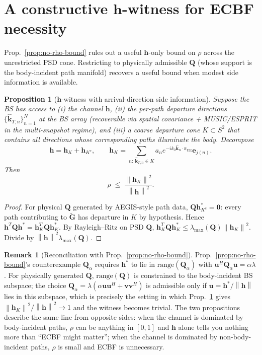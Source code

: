 \documentclass[11pt,a4paper]{article}
\newtheorem{proposition}[theorem]{Proposition}
\theoremstyle{definition}
\newtheorem{remark}[theorem]{Remark}
\newcommand{\rr}{\mathbf{r}}
\newcommand{\hh}{\mathbf{h}}
\newcommand{\kh}{\hat{\mathbf{k}}}
\newcommand{\Q}{\mathbf{Q}}
\newcommand{\Gt}{\widetilde{\mathbf{G}}}
\newcommand{\lammax}{\lambda_{\max}}
\newcommand{\norm}[1]{\left\lVert #1 \right\rVert}
\begin{document}
\section{A constructive \texorpdfstring{$\hh$}{h}-witness for ECBF necessity}
\label{sec:rho-witness}

Prop.~\ref{prop:no-rho-bound} rules out a useful $\hh$-only bound on
$\rho$ across the unrestricted PSD cone. Restricting to physically
admissible $\Q$ (whose support is the body-incident path manifold)
recovers a useful bound when modest side information is available.

\begin{proposition}[$\hh$-witness with arrival-direction side information]
\label{prop:rho-witness}
Suppose the BS has access to (i) the channel $\hh$, (ii) the per-path
\emph{departure} directions $\{\kh_{T,n}\}_{n=1}^N$ at the BS array
(recoverable via spatial covariance + MUSIC/ESPRIT in the
multi-snapshot regime), and (iii) a coarse departure cone
$K\subset S^2$ that contains all directions whose corresponding paths
illuminate the body. Decompose
\[
  \hh = \hh_K + \hh_{K^c},
  \qquad
  \hh_K = \sum_{n:\,\kh_{T,n}\in K}
          a_n e^{-ik_0\kh_n\cdot\rr_{\mathrm{UE}}}\mathbf{e}_{j(n)}.
\]
Then
\begin{equation}
  \rho \;\le\; \frac{\norm{\hh_K}^2}{\norm{\hh}^2}.
  \label{eq:rho-witness}
\end{equation}
\end{proposition}

\begin{proof}
For physical $\Q$ generated by AEGIS-style path data,
$\Q\hh_{K^c}^*=\mathbf{0}$: every path contributing to $\Gt$ has
departure in $K$ by hypothesis. Hence $\hh^T\Q\hh^*=\hh_K^T\Q\hh_K^*$.
By Rayleigh--Ritz on PSD $\Q$,
$\hh_K^T\Q\hh_K^*\le\lammax(\Q)\norm{\hh_K}^2$. Divide by
$\norm{\hh}^2\lammax(\Q)$.
\end{proof}

\begin{remark}[Reconciliation with Prop.~\ref{prop:no-rho-bound}]
\label{rem:reconcile}
Prop.~\ref{prop:no-rho-bound}'s counterexample $\Q_\alpha$ requires
$\hh^*$ to lie in $\mathrm{range}(\Q_\alpha)$ with
$\mathbf{u}^H\Q_\alpha\mathbf{u}=\alpha\lambda$. For physically generated
$\Q$, $\mathrm{range}(\Q)$ is constrained to the body-incident BS
subspace; the choice $\Q_\alpha=\lambda(\alpha\mathbf{u}\mathbf{u}^H+\mathbf{v}\mathbf{v}^H)$
is admissible only if $\mathbf{u}=\hh^*/\norm{\hh}$ lies in this
subspace, which is precisely the setting in which Prop.~\ref{prop:rho-witness}
gives $\norm{\hh_K}^2/\norm{\hh}^2\!\to\!1$ and the witness becomes
trivial. The two propositions describe the same line from opposite
sides: when the channel is dominated by body-incident paths, $\rho$ can
be anything in $[0,1]$ and $\hh$ alone tells you nothing more than
``ECBF might matter''; when the channel is dominated by
non-body-incident paths, $\rho$ is small and ECBF is unnecessary.
\end{remark}
\end{document}
